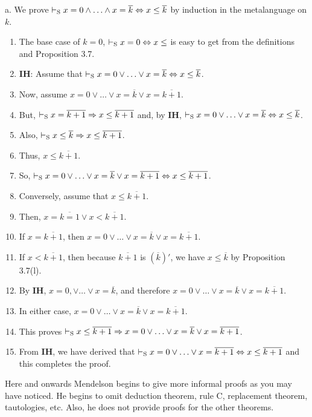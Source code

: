 a. We prove $\vdash_\text{S} x=0 \land \ldots \land x=\overline{k} \Leftrightarrow x \leq \overline{k}$ by induction in the metalanguage on $k$.
\begin{enumerate}
    \item The base case of $k=0$, $\vdash_\text{S} x=0 \Leftrightarrow x \leq $ is easy to get from the definitions and Proposition 3.7.
    \item \textbf{IH}: Assume that $\vdash_\text{S} x=0 \lor \ldots \lor x=\overline{k} \Leftrightarrow x \leq \overline{k}$.
    \item Now, assume $x=0 \lor \ldots \lor x= \overline{k} \lor x= \overline{k+1}$.
    \item But, $\vdash_\text{S} x = \overline{k+1} \Rightarrow x \leq \overline{k+1}$ and, by \textbf{IH}, $\vdash_\text{S} x=0 \lor \ldots \lor x=\overline{k} \Leftrightarrow x \leq \overline{k}$.
    \item Also, $\vdash_\text{S} x \leq \overline{k} \Rightarrow x \leq \overline{k+1}$.
    \item Thus, $x \leq \overline{k+1}$.
    \item So, $\vdash_\text{S} x=0 \lor \ldots \lor x=\overline{k} \lor x=\overline{k+1} \Leftrightarrow x \leq \overline{k+1}$.
    \item Conversely, assume that $x \leq \overline{k+1}$.
    \item Then, $x=\overline{k=1} \lor x<\overline{k+1}$.
    \item If $x=\overline{k+1}$, then $x=0 \lor \ldots \lor x= \overline{k} \lor x=\overline{k+1}$.
    \item If $x < \overline{k+1}$, then because $\overline{k+1}$ is $(\overline{k})'$, we have $x \leq \overline{k}$ by Proposition 3.7(l).
    \item By \textbf{IH}, $x=0, \lor \ldots \lor x=\overline{k}$, and therefore $x=0 \lor \ldots \lor x= \overline{k} \lor x=\overline{k+1}$.
    \item In either case, $x=0 \lor \ldots \lor x=\overline{k} \lor x=\overline{k+1}$.
    \item This proves $\vdash_\text{S} x \leq \overline{k+1} \Rightarrow x=0 \lor \ldots \lor x=\overline{k} \lor x= \overline{k+1}$.
    \item From \textbf{IH}, we have derived that $\vdash_\text{S} x=0 \lor \ldots \lor x=\overline{k+1} \Leftrightarrow x \leq \overline{k+1}$ and this completes the proof.
\end{enumerate}

Here and onwards Mendelson begins to give more informal proofs as you may have noticed. He begins to omit deduction theorem, rule C, replacement theorem, tautologies, etc. Also, he does not provide proofs for the other theorems.

